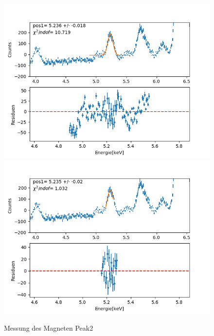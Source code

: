 \documentclass[12pt,a4paper]{article}
\begin{document}
\begin{figure}[H]
\centering
\includegraphics[scale=0.49]{Bilder/roentgen_spektren/magnet/mag2_1.png}
\includegraphics[scale=0.49]{Bilder/roentgen_spektren/magnet/mag2_2.png}
\caption{Messung des Magneten Peak2}
\end{figure}
\end{document}
